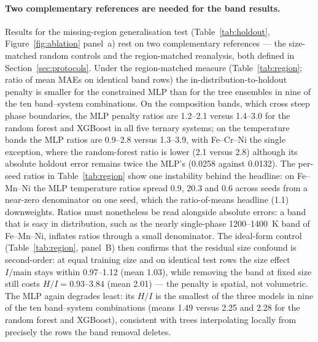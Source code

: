 \documentclass[preprint,12pt,authoryear]{elsarticle}
\begin{document}
\paragraph{Two complementary references are needed for the band results.}
Results for the missing-region generalisation test (Table~\ref{tab:holdout},
Figure~\ref{fig:ablation} panel~a) rest on two complementary references ---
the size-matched random controls and the region-matched reanalysis, both
defined in Section~\ref{sec:protocols}. Under the region-matched measure
(Table~\ref{tab:region}; ratio of mean MAEs on identical band rows) the
in-distribution-to-holdout penalty is smaller for the constrained MLP
than for the tree ensembles in nine of the ten band--system
combinations. On the composition bands, which cross steep
phase boundaries, the MLP penalty ratios are 1.2--2.1 versus 1.4--3.0 for
the random forest and XGBoost in all five ternary systems; on the temperature bands
the MLP ratios are 0.9--2.8 versus 1.3--3.9, with Fe--Cr--Ni the single
exception, where the random-forest ratio is lower (2.1 versus
2.8) although its absolute holdout error remains twice the MLP's
(0.0258 against 0.0132). The per-seed ratios in Table~\ref{tab:region}
show one instability behind the headline: on Fe--Mn--Ni the MLP
temperature ratios spread 0.9, 20.3 and 0.6 across seeds from a
near-zero denominator on one seed, which the ratio-of-means headline
(1.1) downweights.
Ratios must nonetheless be read alongside absolute errors: a band that is
easy in distribution, such as the nearly single-phase 1200--1400~K band of
Fe--Mn--Ni, inflates ratios through a small denominator.
The ideal-form control (Table~\ref{tab:region}, panel~B) then confirms
that the residual size confound is second-order: at equal training size
and on identical test rows the size effect $I/\mathrm{main}$ stays within
0.97--1.12 (mean 1.03), while removing the band at fixed size still costs
$H/I = 0.93$--$3.84$ (mean 2.01) --- the penalty is spatial, not
volumetric. The MLP again degrades least: its $H/I$ is the smallest of
the three models in nine of the ten band--system combinations (means 1.49
versus 2.25 and 2.28 for the random forest and XGBoost), consistent with
trees interpolating locally from precisely the rows the band removal
deletes.
\end{document}
